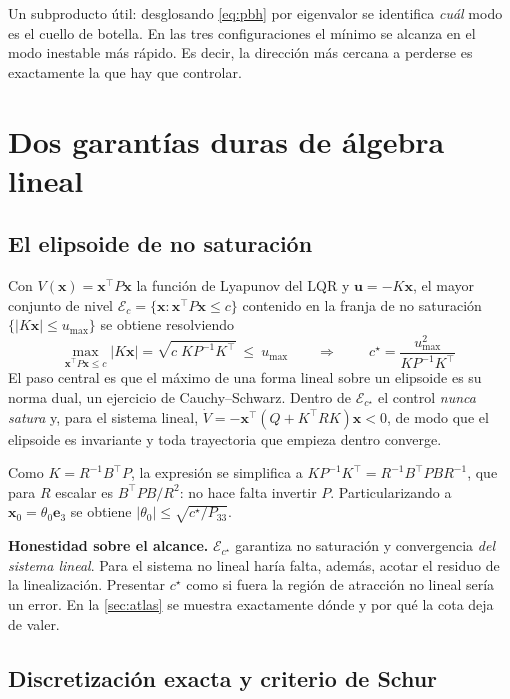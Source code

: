 \documentclass[11pt,letterpaper]{article}
\theoremstyle{definition}
\theoremstyle{plain}
\theoremstyle{remark}
\newcommand{\calE}{\mathcal{E}}
\newcommand{\xv}{\bm{x}}
\newcommand{\uv}{\bm{u}}
\begin{document}
Un subproducto útil: desglosando \cref{eq:pbh} por eigenvalor se identifica
\emph{cuál} modo es el cuello de botella. En las tres configuraciones el mínimo
se alcanza en el modo inestable más rápido. Es decir, la dirección más cercana a
perderse es exactamente la que hay que controlar.

\section{Dos garantías duras de álgebra lineal}

\subsection{El elipsoide de no saturación}
\label{sec:elipsoide}

Con $V(\xv)=\xv^\top P\xv$ la función de Lyapunov del LQR y $\uv=-K\xv$, el
mayor conjunto de nivel $\calE_c=\{\xv:\xv^\top P\xv\le c\}$ contenido en la
franja de no saturación $\{|K\xv|\le u_{\max}\}$ se obtiene resolviendo
\[
\max_{\xv^\top P\xv\le c}|K\xv|=\sqrt{c\;KP^{-1}K^\top}\ \le\ u_{\max}
\qquad\Longrightarrow\qquad
\boxed{\ c^\star=\frac{u_{\max}^2}{KP^{-1}K^\top}\ }
\]
El paso central es que el máximo de una forma lineal sobre un elipsoide es su
norma dual, un ejercicio de Cauchy--Schwarz. Dentro de $\calE_{c^\star}$ el
control \emph{nunca satura} y, para el sistema lineal,
$\dot V=-\xv^\top(Q+K^\top RK)\xv<0$, de modo que el elipsoide es invariante y
toda trayectoria que empieza dentro converge.

Como $K=R^{-1}B^\top P$, la expresión se simplifica a
$KP^{-1}K^\top=R^{-1}B^\top PBR^{-1}$, que para $R$ escalar es $B^\top PB/R^2$:
no hace falta invertir $P$. Particularizando a $\xv_0=\theta_0\bm{e}_3$ se
obtiene $|\theta_0|\le\sqrt{c^\star/P_{33}}$.

\begin{alerta}
\small
\textbf{Honestidad sobre el alcance.} $\calE_{c^\star}$ garantiza no saturación
y convergencia \emph{del sistema lineal}. Para el sistema no lineal haría falta,
además, acotar el residuo de la linealización. Presentar $c^\star$ como si fuera
la región de atracción no lineal sería un error. En la \cref{sec:atlas} se
muestra exactamente dónde y por qué la cota deja de valer.
\end{alerta}

\subsection{Discretización exacta y criterio de Schur}
\label{sec:zoh}
\end{document}
